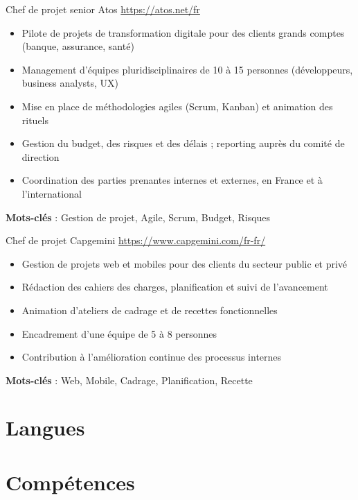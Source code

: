 \documentclass[a4paper, serif, 10pt]{moderncv}
\begin{document}
        {Chef de projet senior}
        {Atos}
        {\url{https://atos.net/fr}}
        {}
        {\begin{itemize}
\item Pilote de projets de transformation digitale pour des clients grands comptes (banque, assurance, santé)
\item Management d'équipes pluridisciplinaires de 10 à 15 personnes (développeurs, business analysts, UX)
\item Mise en place de méthodologies agiles (Scrum, Kanban) et animation des rituels
\item Gestion du budget, des risques et des délais ; reporting auprès du comité de direction
\item Coordination des parties prenantes internes et externes, en France et à l'international
\end{itemize}
\textbf{Mots-clés} : Gestion de projet, Agile, Scrum, Budget, Risques}

        {Chef de projet}
        {Capgemini}
        {\url{https://www.capgemini.com/fr-fr/}}
        {}
        {\begin{itemize}
\item Gestion de projets web et mobiles pour des clients du secteur public et privé
\item Rédaction des cahiers des charges, planification et suivi de l'avancement
\item Animation d'ateliers de cadrage et de recettes fonctionnelles
\item Encadrement d'une équipe de 5 à 8 personnes
\item Contribution à l'amélioration continue des processus internes
\end{itemize}
\textbf{Mots-clés} : Web, Mobile, Cadrage, Planification, Recette}
\section{Langues}

\section{Compétences}
\end{document}
